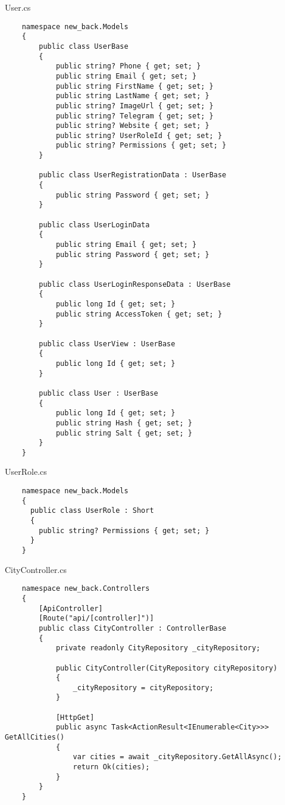 User.cs
\lstset{style=sharpc}
\begin{lstlisting}
    namespace new_back.Models
    {
        public class UserBase
        {
            public string? Phone { get; set; }
            public string Email { get; set; }
            public string FirstName { get; set; }
            public string LastName { get; set; }
            public string? ImageUrl { get; set; }
            public string? Telegram { get; set; }
            public string? Website { get; set; }
            public string? UserRoleId { get; set; }
            public string? Permissions { get; set; }
        }
        
        public class UserRegistrationData : UserBase
        {
            public string Password { get; set; }
        }
    
        public class UserLoginData
        {
            public string Email { get; set; }
            public string Password { get; set; }
        }
        
        public class UserLoginResponseData : UserBase
        {
            public long Id { get; set; }
            public string AccessToken { get; set; }
        }
        
        public class UserView : UserBase
        {
            public long Id { get; set; }
        }
        
        public class User : UserBase
        {
            public long Id { get; set; }
            public string Hash { get; set; }
            public string Salt { get; set; }
        }
    }    
\end{lstlisting}

UserRole.cs
\lstset{style=sharpc}
\begin{lstlisting}
    namespace new_back.Models
    {
      public class UserRole : Short
      {
        public string? Permissions { get; set; }
      }
    }
\end{lstlisting}

CityController.cs
\lstset{style=sharpc}
\begin{lstlisting}
    namespace new_back.Controllers
    {
        [ApiController]
        [Route("api/[controller]")]
        public class CityController : ControllerBase
        {
            private readonly CityRepository _cityRepository;
    
            public CityController(CityRepository cityRepository)
            {
                _cityRepository = cityRepository;
            }
    
            [HttpGet]
            public async Task<ActionResult<IEnumerable<City>>> GetAllCities()
            {
                var cities = await _cityRepository.GetAllAsync();
                return Ok(cities);
            }
        }
    }
\end{lstlisting}

